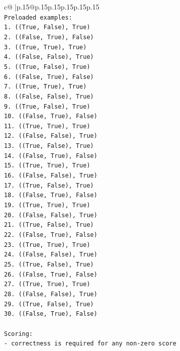 \documentclass{article}
\begin{document}
{\begin{supertabular}{c@{$\;$}|p{.15\linewidth}@{}p{.15\linewidth}p{.15\linewidth}p{.15\linewidth}p{.15\linewidth}p{.15\linewidth}}
{{{\\ 
\texttt{Preloaded examples:} \\
\texttt{1. ((True, False), True)} \\
\texttt{2. ((False, True), False)} \\
\texttt{3. ((True, True), True)} \\
\texttt{4. ((False, False), True)} \\
\texttt{5. ((True, False), True)} \\
\texttt{6. ((False, True), False)} \\
\texttt{7. ((True, True), True)} \\
\texttt{8. ((False, False), True)} \\
\texttt{9. ((True, False), True)} \\
\texttt{10. ((False, True), False)} \\
\texttt{11. ((True, True), True)} \\
\texttt{12. ((False, False), True)} \\
\texttt{13. ((True, False), True)} \\
\texttt{14. ((False, True), False)} \\
\texttt{15. ((True, True), True)} \\
\texttt{16. ((False, False), True)} \\
\texttt{17. ((True, False), True)} \\
\texttt{18. ((False, True), False)} \\
\texttt{19. ((True, True), True)} \\
\texttt{20. ((False, False), True)} \\
\texttt{21. ((True, False), True)} \\
\texttt{22. ((False, True), False)} \\
\texttt{23. ((True, True), True)} \\
\texttt{24. ((False, False), True)} \\
\texttt{25. ((True, False), True)} \\
\texttt{26. ((False, True), False)} \\
\texttt{27. ((True, True), True)} \\
\texttt{28. ((False, False), True)} \\
\texttt{29. ((True, False), True)} \\
\texttt{30. ((False, True), False)} \\
\\ 
\texttt{Scoring:} \\
\texttt{{-} correctness is required for any non{-}zero score} \\
}}}
\end{supertabular}}
\end{document}
